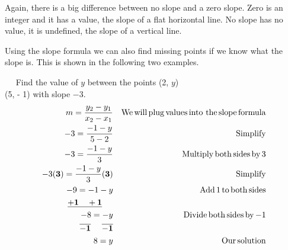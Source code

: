  Again, there is a big difference between no slope and a zero slope. Zero is an
integer and it has a value, the slope of a flat horizontal line. No slope has
no value, it is undefined, the slope of a vertical line.\pp

 Using the slope formula we can also find missing points if we know what the
slope is. This is shown in the following two examples.

\pagebreak

\begin{example}\label{Lin53}~~
 Find the value of $y$ between the points (2, $y$)  \\(5, - 1) with
  slope $- 3$.\\
  \begin{eqnarray*}
    m = \frac{y_2 - y_1}{x_2 - x_1} &  & \operatorname{We} \operatorname{will} \operatorname{plug}
    \operatorname{values} \operatorname{into~the} \operatorname{slope} \operatorname{formula}\\
    - 3 = \frac{- 1 - y}{5 - 2} &  & \operatorname{Simplify}\\
    - 3 = \frac{- 1 - y}{3} &  & \operatorname{Multiply} \operatorname{both} \operatorname{sides}
    \operatorname{by} 3\\
    - 3 {\bf(3)} = \frac{- 1 - y}{3} {\bf(3)} &  & \operatorname{Simplify}\\
    - 9 = - 1 - y &  & \operatorname{Add} 1 \operatorname{to} \operatorname{both} \operatorname{sides}\\
    \bf{\underline{+ 1 ~~~+ 1}}~~~~  &  & \\
    - 8 = - y &  & \operatorname{Divide} \operatorname{both} \operatorname{sides} \operatorname{by} - 1\\
    \bf{\overline{- 1} ~~~~ \overline{- 1}} &  & \\
    8 = y &  & \operatorname{Our} \operatorname{solution}
  \end{eqnarray*}
\end{example}


